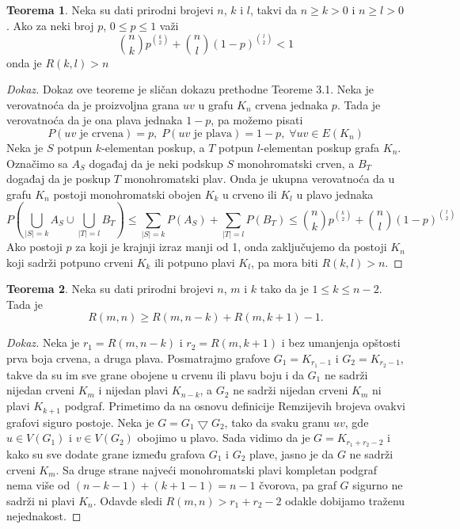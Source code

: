 \documentclass{article}
\theoremstyle{definition}
\newtheorem{teorema}{Teorema}[section]
\newcommand{\dokaz}[1]{\begin{proof}[Dokaz]#1\end{proof}}
\begin{document}
	\begin{teorema}\label{dot2}
	Neka su dati prirodni brojevi $n$, $k$ i $l$, takvi da $n \geq{k} > 0$ i $n \geq{l} > 0$. Ako za neki broj $p$, $0 \leq{p} \leq 1$ važi
	$$\binom{n}{k}p^{\binom{k}{2}} + \binom{n}{l}(1 - p)^{\binom{l}{2}} < 1$$ onda je $R(k,l) > n$
	\dokaz{
		Dokaz ove teoreme je sličan dokazu prethodne Teoreme 3.1. Neka je verovatnoća da je proizvoljna grana $uv$ u grafu $K_n$ crvena jednaka $p$. Tada je verovatnoća da je ona               	plava jednaka $1 - p$, pa možemo pisati 
		$$P(uv \text{ je crvena}) = p,\; P(uv \text{ je plava}) = 1 - p, \; \forall uv \in E(K_n)$$
		Neka je $S$ potpun $k$-elementan poskup, a $T$ potpun $l$-elementan poskup grafa $K_n$. Označimo sa $A_S$ događaj da je neki podskup $S$ monohromatski crven, a $B_T$ događaj  	da je poskup $T$ monohromatski plav. Onda je ukupna verovatnoća da u grafu $K_n$ postoji monohromatski obojen $K_k$ u crveno ili $K_l$ u plavo jednaka
		$$P\left(\bigcup_{|S|=k}A_S \cup \bigcup_{|T|=l}B_T \right) \leq \sum_{|S|=k}P(A_S) + \sum_{|T|=l}P(B_T) \leq \binom{n}{k}p^{\binom{k}{2}} + \binom{n}{l}(1 - p)^{\binom{l}{2}}$$
		Ako postoji $p$ za koji je krajnji izraz manji od 1, onda zaključujemo da postoji $K_n$  koji sadrži potpuno crveni $K_k$ ili potpuno plavi $K_l$, pa mora biti $R(k,l)>n$.
	}
	\end{teorema}
	\begin{teorema}\label{dot3}
	Neka su dati prirodni brojevi $n$, $m$ i $k$ tako da je $1\leq k \leq n - 2$. Tada je $$R(m,n) \geq R(m, n - k) + R(m, k + 1) - 1.$$ 
	\dokaz{
		Neka je $r_1 = R(m, n - k)$ i $r_2 = R(m, k + 1)$ i bez umanjenja opštosti prva boja crvena, a druga plava. Posmatrajmo grafove 
		$G_1 =K_{r_1 - 1}$ i $G_2 = K_{r_2 - 1}$, takve da su im sve grane obojene u crvenu ili plavu boju i da $G_1$ ne sadrži nijedan crveni $K_m$ i
		nijedan plavi $K_{n - k}$, a $G_2$ ne sadrži nijedan crveni $K_m$ ni plavi $K_{k + 1}$ podgraf. Primetimo da na osnovu definicije Remzijevih
		brojeva ovakvi grafovi siguro postoje. Neka je $G = G_1 \bigtriangledown G_2$, tako da svaku granu $uv$, gde $u \in V(G_1)$ i $v \in V(G_2)$
		obojimo u plavo. Sada vidimo da je $G = K_{r_1 + r_2 - 2}$ i kako su sve dodate grane između grafova $G_1$ i $G_2$ plave, jasno je da $G$ ne
		sadrži crveni $K_m$. Sa druge strane najveći monohromatski plavi kompletan podgraf nema više od $(n - k - 1) + (k + 1 - 1) = n - 1$ čvorova, pa 			graf $G$ sigurno ne sadrži ni plavi $K_n$. Odavde sledi $R(m,n) > r_1 + r_2 - 2$ odakle dobijamo traženu nejednakost. 
	}
	\end{teorema}
\end{document}
